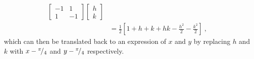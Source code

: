 \begin{example}
\begin{enumerate}[(i)]
\begin{equation*}
\begin{split}
	\begin{bmatrix} -1 & 1 \\ 1 & -1	\end{bmatrix}
	\begin{bmatrix} h \\ k \end{bmatrix} \\
	& = \frac{1}{2} \left[ 1 + h + k + hk - \frac{h^2}{2} - \frac{k^2}{2} \right] \:,
	\end{split}
	\end{equation*}
	which can then be translated back to an expression of $x$ and $y$ by replacing $h$ and $k$ with $x-{}^{\pi}\!/_{4}$ and $y-{}^{\pi}\!/_{4}$ respectively.
\end{enumerate}
\end{example}


